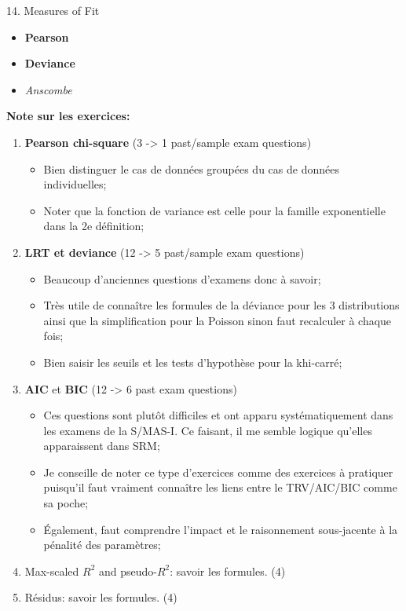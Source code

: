 \documentclass[12pt, titlepage, french]{report}
\begin{document}
\begin{CHPT_SUMM}{14. Measures of Fit}
\begin{enumerate}
\begin{itemize}
\begin{itemize}
		\end{itemize}
		\item	\textbf{Pearson} 
		\item	\textbf{Deviance} 
		\item	\textit{Anscombe} 
	\end{itemize}
\end{enumerate}
\textbf{Note sur les exercices:} 
\begin{enumerate}
	\item	\textbf{Pearson chi-square} (3 -> 1 past/sample exam questions)
	\begin{itemize}
		\item	Bien distinguer le cas de données groupées du cas de données individuelles;
		\item	Noter que la fonction de variance est celle pour la famille exponentielle dans la 2e définition;
	\end{itemize}
	\item	\textbf{LRT et deviance} (12 -> 5 past/sample exam questions)
	\begin{itemize}
		\item	Beaucoup d'anciennes questions d'examens donc à savoir;
		\item	Très utile de connaître les formules de la déviance pour les 3 distributions ainsi que la simplification pour la Poisson sinon faut recalculer à chaque fois;
		\item	Bien saisir les seuils et les tests d'hypothèse pour la khi-carré;
	\end{itemize}
	\item	\textbf{AIC} et \textbf{BIC} (12 -> 6 past exam questions)
	\begin{itemize}
		\item	Ces questions sont plutôt difficiles et ont apparu systématiquement dans les examens de la S/MAS-I. Ce faisant, il me semble logique qu'elles apparaissent dans SRM;
		\item	Je conseille de noter ce type d'exercices comme des exercices à pratiquer puisqu'il faut vraiment connaître les liens entre le TRV/AIC/BIC comme sa poche;
		\item	Également, faut comprendre l'impact et le raisonnement sous-jacente à la pénalité des paramètres;
	\end{itemize}
	\item	Max-scaled $R^{2}$ and pseudo-$R^{2}$: savoir les formules. (4)
	\item	Résidus: savoir les formules. (4)
\end{enumerate}
\end{CHPT_SUMM}
\end{document}
